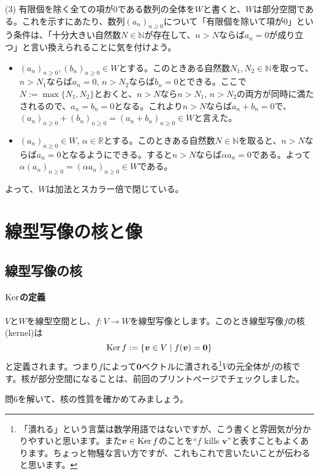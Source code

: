 \noindent (3) 有限個を除く全ての項が$0$である数列の全体を$W$と書くと、$W$は部分空間である。これを示すにあたり、数列$(a_n)_{n\geq 0}$について「有限個を除いて項が$0$」という条件は、「十分大きい自然数$N\in\mathbb{N}$が存在して、$n>N$ならば$a_n = 0$が成り立つ」と言い換えられることに気を付けよう。
\begin{itemize}
\item $(a_n)_{n \geq 0}, (b_n)_{n \geq 0}\in W$とする。このときある自然数$N_1, N_2\in\mathbb{N}$を取って、$n > N_1$ならば$a_n =0$, $n > N_2$ならば$b_n = 0$とできる。ここで$N := \max\{N_1, N_2\}$とおくと、$n > N$なら$n > N_1$, $n > N_2$の両方が同時に満たされるので、$a_n = b_n = 0$となる。これより$n > N$ならば$a_n + b_n = 0$で、$(a_n)_{n \geq 0} + (b_n)_{n \geq 0} = (a_n + b_n)_{n \geq 0}\in W$と言えた。
\item $(a_n)_{n \geq 0}\in W$, $\alpha \in \mathbb{R}$とする。このときある自然数$N\in\mathbb{N}$を取ると、$n > N$ならば$a_n = 0$となるようにできる。すると$n > N$ならば$\alpha a_n = 0$である。よって$\alpha (a_n)_{n \geq 0} = (\alpha a_n)_{n \geq 0}\in W$である。
\end{itemize}
よって、$W$は加法とスカラー倍で閉じている。

\section{線型写像の核と像}

\subsection{線型写像の核}

\paragraph{$\operatorname{Ker}$の定義}

$V$と$W$を線型空間とし、$f\colon V\rightarrow W$を線型写像とします。このとき線型写像$f$の核(kernel)は
\[
\operatorname{Ker} f:=\{\boldsymbol{v}\in V\mid f(\boldsymbol{v})=\boldsymbol{0}\}
\]
と定義されます。つまり$f$によって$\bm{0}$ベクトルに潰される\footnote{「潰れる」という言葉は数学用語ではないですが、こう書くと雰囲気が分かりやすいと思います。また$\boldsymbol{v}\in\operatorname{Ker} f$のことを``$f$ kills $\bm{v}$''と表すこともよくあります。ちょっと物騒な言い方ですが、これもこれで言いたいことが伝わると思います。}$V$の元全体が$f$の核です。核が部分空間になることは、前回のプリント\pageref{subsec:kernel}ページでチェックしました。

問6を解いて、核の性質を確かめてみましょう。

